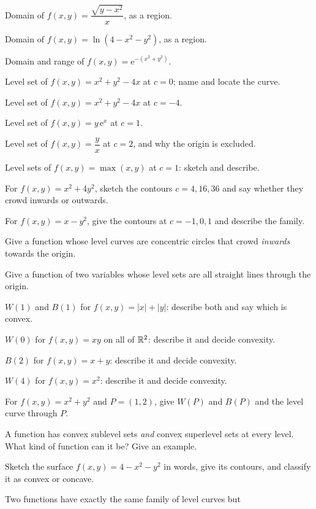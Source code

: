 \begin{problems}
  \item Domain of $f(x,y)=\dfrac{\sqrt{y-x^{2}}}{x}$, as a region.
  \item Domain of $f(x,y)=\ln(4-x^{2}-y^{2})$, as a region.
  \item Domain and range of $f(x,y)=\mathrm{e}^{-(x^{2}+y^{2})}$.
  \item Level set of $f(x,y)=x^{2}+y^{2}-4x$ at $c=0$; name and locate the
        curve.
  \item Level set of $f(x,y)=x^{2}+y^{2}-4x$ at $c=-4$.
  \item Level set of $f(x,y)=y\,\mathrm{e}^{x}$ at $c=1$.
  \item Level set of $f(x,y)=\dfrac{y}{x}$ at $c=2$, and why the origin is
        excluded.
  \item Level sets of $f(x,y)=\max(x,y)$ at $c=1$: sketch and describe.
  \item For $f(x,y)=x^{2}+4y^{2}$, sketch the contours $c=4,16,36$ and say
        whether they crowd inwards or outwards.
  \item For $f(x,y)=x-y^{2}$, give the contours at $c=-1,0,1$ and describe
        the family.
  \item Give a function whose level curves are concentric circles that
        crowd \emph{inwards} towards the origin.
  \item Give a function of two variables whose level sets are all straight
        lines through the origin.
  \item $W(1)$ and $B(1)$ for $f(x,y)=|x|+|y|$: describe both and say which
        is convex.
  \item $W(0)$ for $f(x,y)=xy$ on all of $\mathbb{R}^{2}$: describe it and decide
        convexity.
  \item $B(2)$ for $f(x,y)=x+y$: describe it and decide convexity.
  \item $W(4)$ for $f(x,y)=x^{2}$: describe it and decide convexity.
  \item For $f(x,y)=x^{2}+y^{2}$ and $P=(1,2)$, give $W(P)$ and $B(P)$ and
        the level curve through $P$.
  \item A function has convex sublevel sets \emph{and} convex superlevel
        sets at every level. What kind of function can it be? Give an
        example.
  \item Sketch the surface $f(x,y)=4-x^{2}-y^{2}$ in words, give its
        contours, and classify it as convex or concave.
  \item Two functions have exactly the same family of level curves but

\end{problems}
